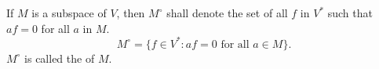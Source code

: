If $M$ is a subspace of $V$, then $M^\circ$ shall denote the set of all $f$ in $V^*$ such that $af = 0$ for all $a$ in $M$.
$$
M^\circ = \{ f \in V^* : af = 0 \text{ for all } a \in M \}.
$$
$M^\circ$ is called the  of $M$.
